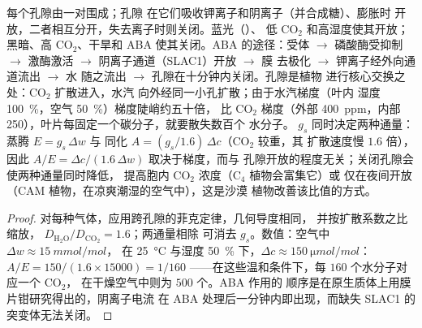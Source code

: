 \begin{proposition}[气孔作为阀门]\label{prop:b3:plant-molecular-physiology:stomata}
每个孔隙由一对\emph{}围成；孔隙
在它们吸收钾离子和阴离子（并合成糖）、膨胀时
开放，二者相互分开，失去离子时则关闭。蓝光（）、
低 CO$_{2}$ 和高湿度使其开放；黑暗、高 CO$_{2}$、干旱和
ABA 使其关闭。ABA 的途径：受体 $\to$ 磷酸酶受抑制 $\to$
激酶激活 $\to$ 阴离子通道（SLAC1）开放 $\to$ 膜
去极化 $\to$ 钾离子经外向通道流出 $\to$ 水
随之流出 $\to$ 孔隙在十分钟内关闭。孔隙是植物
进行核心交换之处：CO$_{2}$ 扩散进入，水汽
向外经同一小孔扩散；由于水汽梯度（叶内
湿度 \qty{100}{\%}，空气 \qty{50}{\%}）梯度陡峭约五十倍，
比 CO$_{2}$ 梯度（外部 \qty{400}{ppm}，内部
\qty{250}{}），叶片每固定一个碳分子，就要散失数百个
水分子。\emph{}
$g_{s}$ 同时决定两种通量：蒸腾 $E = g_{s}\,\Delta w$ 与
同化 $A = (g_{s}/1.6)\,\Delta c$（CO$_{2}$ 较重，其
扩散速度慢 $1.6$ 倍），因此\emph{}
$A/E = \Delta c/(1.6\,\Delta w)$ 取决于梯度，而与
孔隙开放的程度无关；关闭孔隙会使两种通量同时降低，
提高胞内 CO$_{2}$ 浓度（C$_{4}$ 植物会富集它）或
仅在夜间开放（CAM 植物，在凉爽潮湿的空气中），这是沙漠
植物改善该比值的方式。
\end{proposition}
\begin{proof}
对每种气体，应用跨孔隙的菲克定律，几何导度相同，
并按扩散系数之比缩放，
$D_{\mathrm{H_2O}}/D_{\mathrm{CO_2}} = 1.6$；两通量相除
可消去 $g_{s}$。数值：空气中 $\Delta w \approx \qty{15}{mmol/mol}$，
在 \qty{25}{\celsius} 与湿度 \qty{50}{\%} 下，$\Delta c \approx
\qty{150}{\micro mol/mol}$：$A/E = 150/(1.6\times\num{15000}) = 1/160$
——在这些温和条件下，每 $160$ 个水分子对应一个 CO$_{2}$，
在干燥空气中则为 $500$ 个。ABA 作用的
顺序是在原生质体上用膜片钳研究得出的，阴离子电流
在 ABA 处理后一分钟内即出现，而缺失 SLAC1 的突变体无法关闭。
\end{proof}

